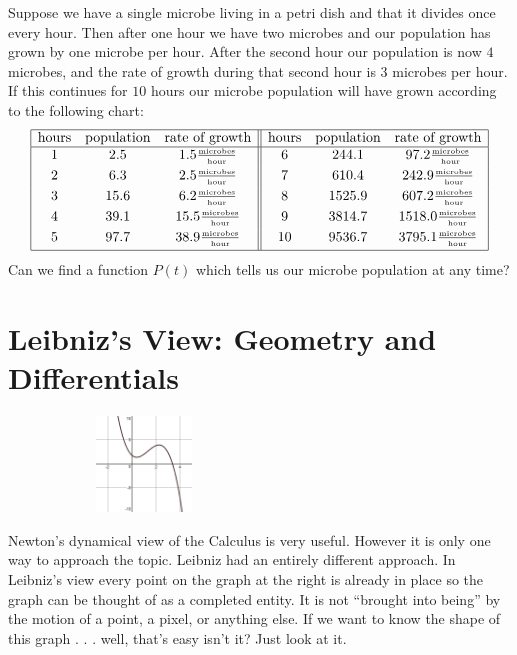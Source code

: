 Suppose we have a single microbe living in a petri dish and that it
divides once every hour. Then after one hour we have two microbes and
our population has grown by one microbe per hour. After the second
hour our population is now $4$ microbes, and the rate of growth during
that second hour is $3$ microbes per hour. If this continues for $10$
hours our microbe population will have grown according to the
following chart:
$$
\begin{array}{|ccc||ccc|}
\hline
  \text{hours}&\text{population}&\text{rate of
                                  growth}&\text{hours}&\text{population}&\text{rate
                                                                          of
                                                                          growth}\\\hline{}
  1&2.5&1.5\frac{\text{\tiny microbes}}{\text{\tiny hour}}&6&244.1&97.2\frac{\text{\tiny microbes}}{\text{\tiny hour}}\\[1mm]
  2&6.3&2.5\frac{\text{\tiny microbes}}{\text{\tiny hour}}&7&610.4&242.9\frac{\text{\tiny microbes}}{\text{\tiny hour}}\\[1mm]
  3&15.6&6.2\frac{\text{\tiny microbes}}{\text{\tiny hour}}&8&1525.9&607.2\frac{\text{\tiny microbes}}{\text{\tiny hour}}\\[1mm]
  4&39.1&15.5\frac{\text{\tiny microbes}}{\text{\tiny hour}}&9&3814.7&1518.0\frac{\text{\tiny microbes}}{\text{\tiny hour}}\\[1mm]
  5&97.7&38.9\frac{\text{\tiny microbes}}{\text{\tiny hour}}&10&9536.7&3795.1\frac{\text{\tiny microbes}}{\text{\tiny hour}}\\[1mm]\hline
\end{array}
$$
Can we find a function $P(t)$ which  tells us our microbe
population at any time?

\section{Leibniz's View: Geometry and Differentials}
\label{sec:leibn-view:-geom}
\begin{figure}
\captionsetup{labelformat=empty}
\centerline{\includegraphics*[height=1in,width=2in]{Figures/LeibnizGraph1}}
\label{fig:LeibnizGraph1}
\end{figure}
Newton's dynamical view of the Calculus is very useful. However it is
only one way to approach the topic. Leibniz had an entirely different
approach. In Leibniz's view every point on the graph  at the right is
already in place so the graph can be thought of as a completed
entity. It is not ``brought into being'' by the motion of a point, a
pixel, or anything else. If we want to know the shape of this graph
. . . well, that's easy isn't it? Just look at it.

